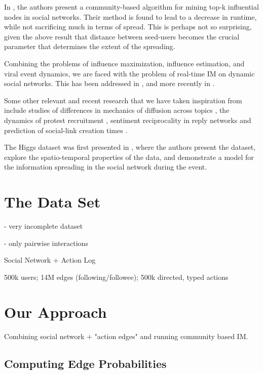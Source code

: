 \documentclass[sigconf]{acmart}
\begin{document}
In \cite{wang2010community}, the authors present a community-based algorithm for mining top-k influential nodes in social networks. Their method is found to lead to a decrease in runtime, while not sacrificing much in terms of spread. This is perhaps not so surprising, given the above result that distance between seed-users becomes the crucial parameter that determines the extent of the spreading. 

Combining the problems of influence maximization, influence estimation, and viral event dynamics, we are faced with the problem of real-time IM on dynamic social networks. This has been addressed in \cite{rodriguez2012influence}, and more recently in \cite{wang2017real}.

Some other relevant and recent research that we have taken inspiration from include studies of differences in mechanics of diffusion across topics \cite{romero2011differences}, the dynamics of protest recruitment \cite{gonzalez2011dynamics}, sentiment reciprocality in reply networks \cite{bliss2012twitter} and prediction of social-link creation times \cite{meeder2011we}.

The Higgs dataset was first presented in \cite{de2013anatomy}, where the authors present the dataset, explore the spatio-temporal properties of the data, and demonstrate a model for the information spreading in the social network during the event.

\section{The Data Set}



- very incomplete dataset

- only pairwise interactions

Social Network + Action Log

500k users; 14M edges (following/followee); 500k directed, typed actions

\section{Our Approach}

Combining social network $+$ "action edges" and running community based IM. 

\subsection{Computing Edge Probabilities}
\end{document}
